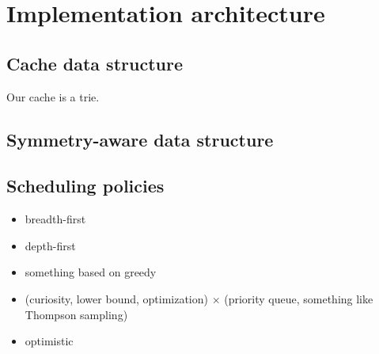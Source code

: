 





\section{Implementation architecture}

\subsection{Cache data structure}
\label{sec:cache}

Our cache is a trie.

\subsection{Symmetry-aware data structure}

\subsection{Scheduling policies}

\begin{itemize}
\item breadth-first
\item depth-first
\item something based on greedy
\item (curiosity, lower bound, optimization) $\times$ (priority queue, something like Thompson sampling)
\item optimistic
\end{itemize}

